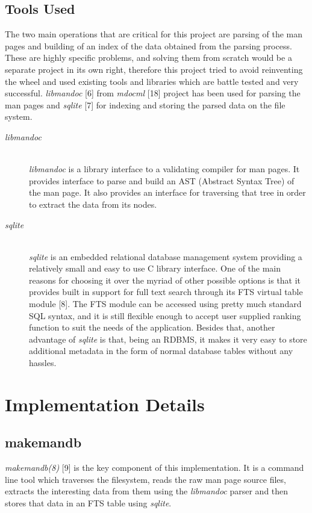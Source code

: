 \documentclass[letterpaper,twocolumn,10pt]{article}
\begin{document}
\subsection{Tools Used}
The two main operations that are critical for this project are parsing of the
man pages and building of an index of the
data obtained from the parsing process. These are highly specific problems, and
solving them from scratch would be a separate project in its own right,
therefore this project tried to avoid reinventing the wheel and used existing
tools and libraries which are battle tested and very successful.
\textit{libmandoc} [6] from \textit{mdocml} [18] project has been used for
parsing the man pages and \textit{sqlite} [7] for indexing and storing the parsed
data on the file system.

\begin{description}
\item[\textit{libmandoc}] \hfill \\
\textit{libmandoc} is a library interface to a validating compiler for man pages. It provides
interface to parse and build an AST (Abstract Syntax Tree) of the man page. It
also provides an interface for traversing that tree in order to extract the data
from its nodes.
\end{description}

\begin{description}
\item[\textit{sqlite}] \hfill \\
\textit{sqlite} is an embedded relational database management system providing a
relatively small and easy to use C library interface. One of the main reasons
for choosing it over the myriad of other possible options is that it provides
built in support for full text search through its FTS virtual table module [8].
The FTS module can be accessed using pretty much standard SQL syntax, and it is
still flexible enough to accept user supplied ranking function to suit the needs
of the application. Besides that, another advantage of \textit{sqlite} is that, 
being an RDBMS, it makes it very easy to store additional metadata in the form
of normal database tables without any hassles.
\end{description}

\section{Implementation Details}

\subsection{makemandb}
\textit{makemandb(8)} [9] is the key component of this implementation. It is a
command line tool which traverses the filesystem, reads the raw man page source files, extracts the interesting data from them using the \textit{libmandoc} parser and then stores that data in an FTS table using \textit{sqlite}. \\
\end{document}
